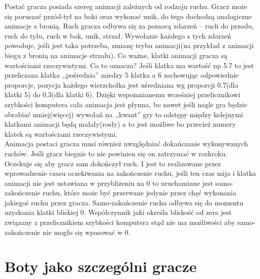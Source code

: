 \documentclass[licencjacka]{pracamgr}
\begin{document}
Postać gracza posiada szereg animacji zależnych od rodzaju ruchu. Gracz może się poruszać przód-tył
na boki oraz wykonać unik, do tego dochodzą analogiczne animacje z bronią. Ruch gracza odbywa się
za pomocą zdarzeń -- ruch do przodu, ruch do tyłu, ruch w bok, unik, strzał. Wywołanie każdego z
tych zdarzeń powoduje, jeśli jest taka potrzeba, zmianę trybu animacji(na przykład z animacji
biegu z bronią na animacje strzału). Co ważne, klatki animacji gracza są wartościami rzeczywistymi.
Co to oznacza? Jeśli klatka ma wartość np 5.7 to jest przeliczana klatka ,,pośrednia'' miedzy
5 klatka a 6 zachowując odpowiednie proporcje, pozycja każdego wierzchołka jest uśredniana wg
proporcji 0.7(dla klatki 5) do 0.3(dla klatki 6). Dzięki wspomnianemu wcześniej przelicznikowi
szybkości komputera cała animacja jest płynna, bo nawet jeśli nagle gra będzie obrabiać mniej(więcej)
wywołań na ,,kwant'' gry to odstępy między kolejnymi klatkami animacji będą malały(rosły) a to
jest możliwe bo przecież numery klatek są wartościami rzeczywistymi. \\
Animacja postaci gracza musi również uwzględniać dokańczanie wykonywanych ruchów.
Jeśli gracz biegnie to nie powinien się on zatrzymać w rozkroku. Oczekuje się aby gracz sam
dokończył ruch. I jest to realizowane przez wprowadzenie czasu oczekiwania na zakończenie ruchu,
jeśli ten czas mija i klatka animacji nie jest ustawiana w przybliżeniu na 0 to uruchamiane jest
samo-zakończenie ruchu, które może być przerwane jedynie przez chęć wykonania jakiegoś ruchu przez
gracza. Samo-zakończenie ruchu odbywa się do momentu uzyskania klatki bliskiej 0. Współczynnik
jaki określa bliskość od zera jest związany z przelicznikiem szybkości komputera stąd nie ma
możliwości aby samo-zakończenie nie mogło się wpasować w 0.

\section{Boty jako szczególni gracze}
\end{document}
